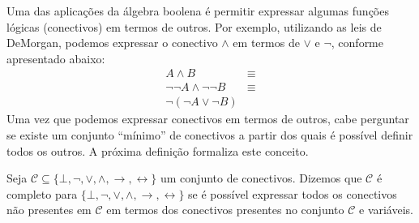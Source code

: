 Uma das aplicações da álgebra boolena é permitir expressar algumas
funções lógicas (conectivos) em termos de outros. Por exemplo,
utilizando as leis de DeMorgan, podemos expressar o conectivo $\land$
em termos de $\lor$ e $\neg$, conforme apresentado abaixo:
\[
\begin{array}{lc}
  A \land B & \equiv \\
\neg\neg A \land \neg\neg B & \equiv \\
\neg(\neg A \lor \neg B)
\end{array}
\]
Uma vez que podemos expressar conectivos em termos de outros, cabe
perguntar se existe um conjunto ``mínimo'' de conectivos a partir dos
quais é possível definir todos os outros. A próxima definição
formaliza este conceito.

\begin{Definition}
Seja
$\mathcal{C}\subseteq\{\bot,\neg,\lor,\land,\to,\leftrightarrow\}$ um
conjunto de conectivos. Dizemos que $\mathcal{C}$ é completo para
$\{\bot,\neg,\lor,\land,\to,\leftrightarrow\}$ se é possível expressar
todos os conectivos não presentes em $\mathcal{C}$ em termos dos
conectivos presentes no conjunto $\mathcal{C}$ e variáveis.
\end{Definition}

